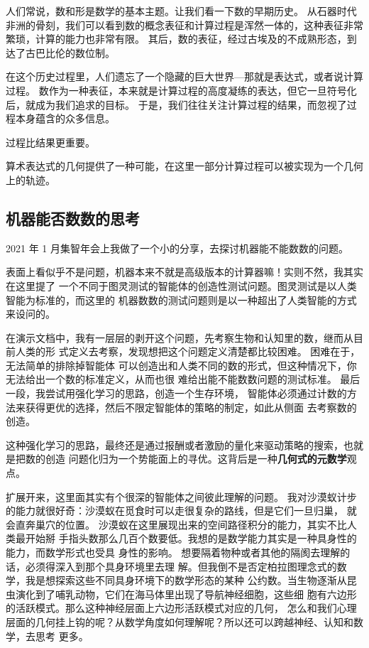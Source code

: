 \documentclass[a4paper,12pt]{article}
\numberwithin{problem}{section}
\numberwithin{definition}{section}
\numberwithin{lemma}{section}
\numberwithin{proposition}{section}
\numberwithin{theorem}{section}
\numberwithin{grammar}{section}
\numberwithin{program}{section}
\numberwithin{convention}{section}
\numberwithin{corollary}{section}
\begin{document}
\begin{displayquote}
人们常说，数和形是数学的基本主题。让我们看一下数的早期历史。
从石器时代非洲的骨刻，我们可以看到数的概念表征和计算过程是浑然一体的，这种表征非常繁琐，计算的能力也非常有限。
其后，数的表征，经过古埃及的不成熟形态，到达了古巴比伦的数位制。

在这个历史过程里，人们遗忘了一个隐藏的巨大世界—那就是表达式，或者说计算过程。
数作为一种表征，本来就是计算过程的高度凝练的表达，但它一旦符号化后，就成为我们追求的目标。
于是，我们往往关注计算过程的结果，而忽视了过程本身蕴含的众多信息。

过程比结果更重要。
\end{displayquote}

算术表达式的几何提供了一种可能，在这里一部分计算过程可以被实现为一个几何上的轨迹。

\subsection{机器能否数数的思考}

2021 年 1 月集智年会上我做了一个小的分享，去探讨机器能不能数数的问题。

表面上看似乎不是问题，机器本来不就是高级版本的计算器嘛！实则不然，我其实在这里提了
一个不同于图灵测试的智能体的创造性测试问题。图灵测试是以人类智能为标准的，而这里的
机器数数的测试问题则是以一种超出了人类智能的方式来设问的。

在演示文档中，我有一层层的剥开这个问题，先考察生物和认知里的数，继而从目前人类的形
式定义去考察，发现想把这个问题定义清楚都比较困难。 困难在于，无法简单的排除掉智能体
可以创造出和人类不同的数的形式，但这种情况下，你无法给出一个数的标准定义，从而也很
难给出能不能数数问题的测试标准。 最后一段，我尝试用强化学习的思路，创造一个生存环境，
智能体必须通过计数的方法来获得更优的选择，然后不限定智能体的策略的制定，如此从侧面
去考察数的创造。

这种强化学习的思路，最终还是通过报酬或者激励的量化来驱动策略的搜索，也就是把数的创造
问题化归为一个势能面上的寻优。这背后是一种\textbf{几何式的元数学}观点。

扩展开来，这里面其实有个很深的智能体之间彼此理解的问题。
我对沙漠蚁计步的能力就很好奇：沙漠蚁在觅食时可以走很复杂的路线，但是它们一旦归巢，
就会直奔巢穴的位置。 沙漠蚁在这里展现出来的空间路径积分的能力，其实不比人类最开始掰
手指头数那么几百个数要低。我想的是数学能力其实是一种具身性的能力，而数学形式也受具
身性的影响。 想要隔着物种或者其他的隔阂去理解的话，必须得深入到那个具身环境里去理
解。但我倒不是否定柏拉图理念式的数学，我是想探索这些不同具身环境下的数学形态的某种
公约数。当生物逐渐从昆虫演化到了哺乳动物，它们在海马体里出现了导航神经细胞，这些细
胞有六边形的活跃模式。那么这种神经层面上六边形活跃模式对应的几何， 怎么和我们心理
层面的几何挂上钩的呢？从数学角度如何理解呢？所以还可以跨越神经、认知和数学，去思考
更多。
\end{document}

